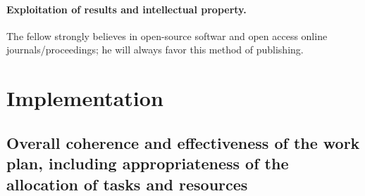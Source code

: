 \documentclass{article}[11pt]
\begin{document}
\paragraph{Exploitation of results and intellectual property.} 
The fellow strongly believes in open-source softwar and open access online journals/proceedings; he will always favor this method of publishing.





\section{Implementation}
\subsection{Overall coherence and effectiveness of the work plan, including appropriateness of the allocation of tasks and resources}
\end{document}
